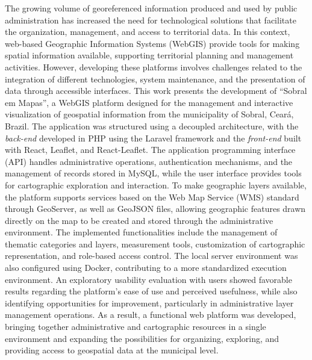 The growing volume of georeferenced information produced and used by public administration has increased the need for technological solutions that facilitate the organization, management, and access to territorial data. In this context, web-based Geographic Information Systems (WebGIS) provide tools for making spatial information available, supporting territorial planning and management activities. However, developing these platforms involves challenges related to the integration of different technologies, system maintenance, and the presentation of data through accessible interfaces. This work presents the development of ``Sobral em Mapas'', a WebGIS platform designed for the management and interactive visualization of geospatial information from the municipality of Sobral, Ceará, Brazil. The application was structured using a decoupled architecture, with the \textit{back-end} developed in PHP using the Laravel framework and the \textit{front-end} built with React, Leaflet, and React-Leaflet. The application programming interface (API) handles administrative operations, authentication mechanisms, and the management of records stored in MySQL, while the user interface provides tools for cartographic exploration and interaction. To make geographic layers available, the platform supports services based on the Web Map Service (WMS) standard through GeoServer, as well as GeoJSON files, allowing geographic features drawn directly on the map to be created and stored through the administrative environment. The implemented functionalities include the management of thematic categories and layers, measurement tools, customization of cartographic representation, and role-based access control. The local server environment was also configured using Docker, contributing to a more standardized execution environment. An exploratory usability evaluation with users showed favorable results regarding the platform's ease of use and perceived usefulness, while also identifying opportunities for improvement, particularly in administrative layer management operations. As a result, a functional web platform was developed, bringing together administrative and cartographic resources in a single environment and expanding the possibilities for organizing, exploring, and providing access to geospatial data at the municipal level.

